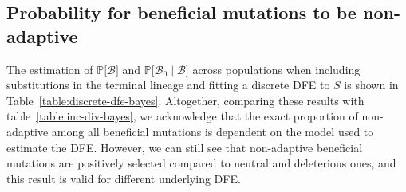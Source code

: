 \documentclass{article}
\newcommand{\proba}{\mathbb{P}}
\newcommand{\SphyBen}{\mathcal{B}_0}
\newcommand{\given}{\mid}
\newcommand{\Spop}{S}
\newcommand{\SpopBen}{\mathcal{B}}
\begin{document}
    \newpage
    \subsection{Probability for beneficial mutations to be non-adaptive}
    The estimation of $\proba{[} \SpopBen {]}$ and $\proba{[}\SphyBen\given \SpopBen {]}$ across populations when including substitutions in the terminal lineage and fitting a discrete DFE to $\Spop$ is shown in Table~\ref{table:discrete-dfe-bayes}.
    Altogether, comparing these results with table~\ref{table:inc-div-bayes}, we acknowledge that the exact proportion of non-adaptive among all beneficial mutations is dependent on the model used to estimate the DFE.
    However, we can still see that non-adaptive beneficial mutations are positively selected compared to neutral and deleterious ones, and this result is valid for different underlying DFE.
\end{document}
